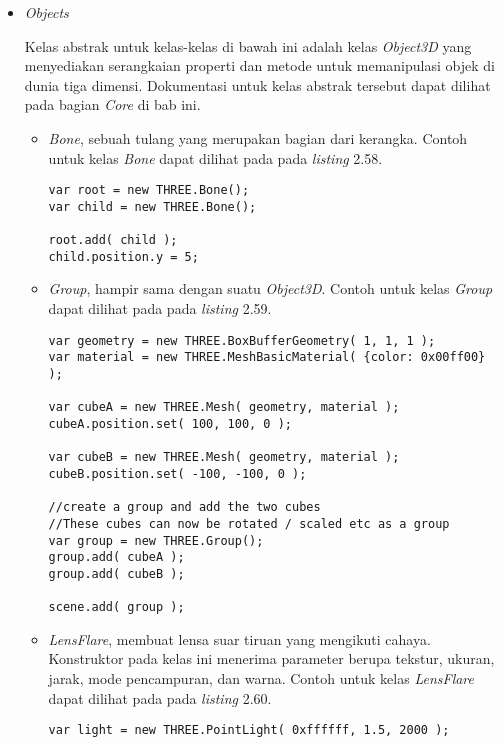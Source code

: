 \begin{itemize}
\begin{itemize}
	\end{itemize}


\item \textit{Objects}

Kelas abstrak untuk kelas-kelas di bawah ini adalah kelas {\it Object3D} yang menyediakan serangkaian properti dan metode untuk memanipulasi objek di dunia tiga dimensi. Dokumentasi untuk kelas abstrak tersebut dapat dilihat pada bagian {\it Core} di bab ini.
	\begin{itemize}
	\item {\it Bone}, sebuah tulang yang merupakan bagian dari kerangka. Contoh untuk kelas {\it Bone} dapat dilihat pada pada {\it listing} 2.58.
	
\begin{lstlisting}[caption={Contoh penggunaan kelas {\it Bone}.},captionpos=b]
var root = new THREE.Bone();
var child = new THREE.Bone();

root.add( child );
child.position.y = 5;
\end{lstlisting}
	
	\item {\it Group}, hampir sama dengan suatu {\it Object3D}. Contoh untuk kelas {\it Group} dapat dilihat pada pada {\it listing} 2.59.
	
\begin{lstlisting}[caption={Contoh penggunaan kelas {\it Group}.},captionpos=b]
var geometry = new THREE.BoxBufferGeometry( 1, 1, 1 );
var material = new THREE.MeshBasicMaterial( {color: 0x00ff00} );

var cubeA = new THREE.Mesh( geometry, material );
cubeA.position.set( 100, 100, 0 );

var cubeB = new THREE.Mesh( geometry, material );
cubeB.position.set( -100, -100, 0 );

//create a group and add the two cubes
//These cubes can now be rotated / scaled etc as a group
var group = new THREE.Group();
group.add( cubeA );
group.add( cubeB );

scene.add( group );
\end{lstlisting}
	
	\item {\it LensFlare}, membuat lensa suar tiruan yang mengikuti cahaya. Konstruktor pada kelas ini menerima parameter berupa tekstur, ukuran, jarak, mode pencampuran, dan warna. Contoh untuk kelas {\it LensFlare} dapat dilihat pada pada {\it listing} 2.60.
	
\begin{lstlisting}[caption={Contoh penggunaan kelas {\it LensFlare}.},captionpos=b]
var light = new THREE.PointLight( 0xffffff, 1.5, 2000 );


\end{lstlisting}
\end{itemize}
\end{itemize}
